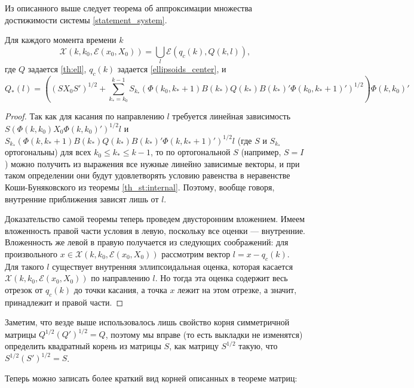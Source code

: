 \documentclass[10pt, a4paper]{article}
\renewcommand{\ell}{\mathcal{E}}
\begin{document}
Из описанного выше следует теорема об аппроксимации множества достижимости системы \eqref{statement_system}.
\begin{theorem}
Для каждого момента времени $k$
\[\mathcal{X}\left(k,k_0,\ell\left(x_0,X_0\right)\right) = 
	\bigcup\limits_{l}\ell\left( q_c(k), Q(k,l) \right), \]
	где $Q$ задается \eqref{th:ell}, $q_c(k)$ задается \eqref{ellipsoids_center}, и 
	\begin{equation}
		Q_*(l) = \left( \left(SX_0S'\right)^{1/2} + \sum\limits_{k_*=k_0}^{k-1}S_{k_*}\left(\Phi(k_0,k_*+1)B(k_*)Q(k_*)B(k_*)'\Phi(k_0,k_*+1)'\right)^{1/2} \right) 
		\Phi(k,k_0)'
	\end{equation}
\end{theorem}
\begin{proof}
	Так как для касания по направлению $l$ требуется линейная зависимость $S\left(\Phi\left(k,k_0\right)X_0\Phi\left(k,k_0\right)'\right)^{1/2}l$ и $S_{k_*}\left(\Phi\left(k,k_*+1\right)B\left(k_*\right)Q\left(k_*\right)B\left(k_*\right)'\Phi\left(k,k_*+1\right)'\right)^{1/2}l$  (где $S$ и  $S_{k_*}$ ортогональны) для всех $k_0 \leqslant k_* \leqslant k-1$, то по ортогональной $S$ (например, $S=I$) можно получить из выражения все нужные линейно зависимые векторы, и при таком определении они будут удовлетворять условию равенства в неравенстве Коши-Буняковского из теоремы \ref{th_st:internal}. Поэтому, вообще говоря, внутренние приближения зависят лишь от $l$.

Доказательство самой теоремы теперь проведем двусторонним вложением. Имеем вложенность правой части условия в левую, поскольку все оценки --- внутренние. Вложенность же левой в правую получается из следующих соображений: для произвольного $x \in \mathcal{X}\left(k,k_0,\ell\left(x_0,X_0\right)\right)$ рассмотрим вектор $l = x - q_c(k)$. Для такого $l$ существует внутренняя эллипсоидальная оценка, которая касается $\mathcal{X}\left(k,k_0,\ell\left(x_0,X_0\right)\right)$ по направлению $l$. Но тогда эта оценка содержит весь отрезок от $q_c(k)$ до точки касания, а точка $x$ лежит на этом отрезке, а значит, принадлежит и правой части.
\end{proof}
\begin{note}
Заметим, что везде выше использовалось лишь свойство корня симметричной матрицы $Q^{1/2}\left(Q'\right)^{1/2} = Q$, поэтому мы вправе (то есть выкладки не изменятся) определить квадратный корень из матрицы $S$, как матрицу $S^{1/2}$ такую, что $S^{1/2}\left(S'\right)^{1/2} = S$.
\end{note}
Теперь можно записать более краткий вид корней описанных в теореме матриц: 
\end{document}
